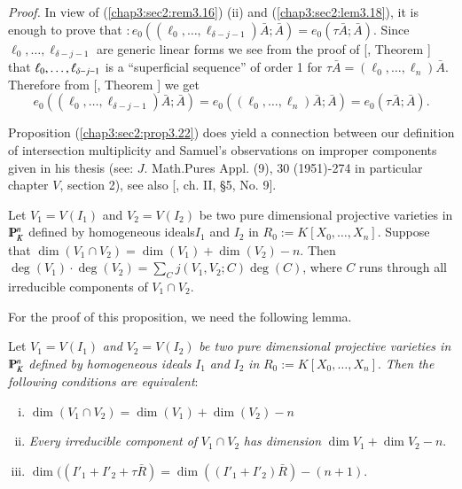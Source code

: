 \noindent \textit{Proof.}
  In view of (\ref{chap3:sec2:rem3.16}) (ii) and (\ref{chap3:sec2:lem3.18}), it is enough to prove that
  $:e_0((\ell_0,\ldots, \ell _{\delta-j-1})\bar{A};\bar{A})=e_0 (\tau
  \bar{A};\bar{A})$. Since $\ell _0,\ldots,\ell_{\delta-j-1}$ are
  generic linear forms we see from the proof of [\cite{51}, Theorem \cite{69}]
  that $\ell_0,\ldots,\break \ell_{\delta-j-1}$ is a ``superficial
  sequence'' of order 1 for $\tau \bar{A}= (\ell_0,\ldots, \ell_n)
  \bar{A}$. Therefore from [\cite{51}, Theorem \cite{71}] we get 
  \begin{equation*}
    e_0 ((\ell_0,\ldots,\ell _{\delta-j-1})\bar{A};\bar{A})= e_0((\ell
    _0,\ldots,\ell_n)\bar{A};\bar{A})=e_0(\tau
    \bar{A};\bar{A}). \tag*{$\Box$} 
  \end{equation*}

\setcounter{remark}{22}
\begin{remark}\label{chap3:sec2:rem3.23}
  Proposition (\ref{chap3:sec2:prop3.22}) does yield a connection between our definition of
  intersection multiplicity and Samuel's observations on improper
  components given in his thesis (see: $J$. Math.Pures Appl. (9), {30}
  (1951)-274  in particular chapter $V$, section 2), see also [\cite{69},
    ch. II, \S 5, No. 9].  
\end{remark}

\setcounter{proposition}{23}
\begin{proposition}\label{chap3:sec2:prop3.24}
  Let $V_1=V(I_1)$  and $ V_2 =V(I_2)$ be two pure
  dimensional projective varieties in  $\varmathbb{P}_K^n$ 
  defined by homogeneous ideals\pageoriginale  $I_1$  and $I_2$ 
  in $R_0:= K[X_0,\ldots,X_n]$. Suppose that $ \dim (V_1
  \cap V_2) = \dim (V_1) + \dim (V_2)-n$. Then
  $\deg(V_1)\cdot \deg(V_2) = \sum\limits_C j(V_1,V_2;C) \deg (C)$,
  where $C$ runs through all irreducible components
  of $V_1 \cap V_2$. 
\end{proposition}
For the proof of this proposition, we need the following lemma.

\setcounter{lemma}{24}
\begin{lemma}\label{chap3:sec2:lem3.25}
  Let $V_1= V(I_1)$ \textit{ and } $V_2=V(I_2)$ \textit {be two pure
    dimensional projective varieties in } $ \varmathbb{P}_K^n$
  \textit{ defined by homogeneous ideals} $I_1$ \textit{ and } $I_2$
  \textit{ in } $ R_0:=K[X_0,\ldots, X_n]$. \textit{ Then the
    following conditions are equivalent}: 

  \begin{enumerate}[(i)]
  \item $\dim (V_1\cap V_2)=\dim (V_1) + \dim (V_2) -n$
  \item \textit{ Every irreducible component of }$ V_1 \cap V_2$
    \textit{ has dimension } $\dim V_1 + \dim V_2 -n$. 
  \item $\dim ((I'_1+I'_2+ \tau \bar{R})= \dim ((I'_1+I'_2)\bar{R})-(n+1)$.
\end{enumerate}
\end{lemma}

